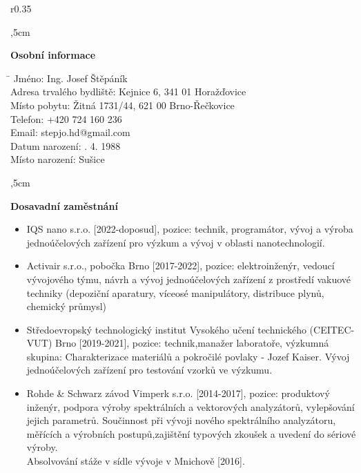 \documentclass[12pt]{article}
\begin{document}
\noindent\hrulefill

\begin{wrapfigure}{r}{0.35\textwidth}
\vspace{-1cm}
\end{wrapfigure}

,5cm

\textbf{Osobní informace} 
\begin{tabbing}
    \hspace{6cm}\= \kill
    Jméno: \> Ing. Josef Štěpáník \\
    Adresa trvalého bydliště: \> Kejnice 6, 341 01 Horažďovice \\
    Místo pobytu: \> Žitná 1731/44, 621 00 Brno-Řečkovice \\
    Telefon: \> +420 724 160 236 \\
    Email: \> stepjo.hd@gmail.com \\
    Datum narození: . 4. 1988 \\
    Místo narození: \> Sušice \\
\end{tabbing}

\noindent\hrulefill
{},5cm

\textbf{Dosavadní zaměstnání}

\begin{itemize}
\item IQS nano s.r.o. [2022-doposud], pozice: technik, programátor, vývoj a výroba jednoúčelových zařízení pro výzkum a vývoj v oblasti nanotechnologií.


\item Activair s.r.o., pobočka Brno [2017-2022], pozice: elektroinženýr, vedoucí vývojového týmu, návrh a vývoj jednoúčelových zařízení z prostředí vakuové techniky (depoziční aparatury, víceosé manipulátory, distribuce plynů, chemický průmysl) 

\item 
Středoevropský technologický institut Vysokého učení technického 
(CEITEC-VUT) Brno [2019-2021], pozice: technik,manažer laboratoře,  výzkumná skupina: Charakterizace materiálů a pokročilé povlaky - Jozef Kaiser. 
Vývoj jednoúčelových zařízení pro testování vzorků ve výzkumu. 

\item Rohde \& Schwarz závod Vimperk s.r.o. [2014-2017], pozice: produktový inženýr, podpora výroby spektrálních a vektorových analyzátorů, vylepšování jejich parametrů. Součinnost při vývoji nového spektrálního analyzátoru, měřících a výrobních postupů,zajištění typových zkoušek a uvedení do sériové výroby. \\
Absolvování stáže v sídle vývoje v Mnichově [2016].
 
\end{itemize}
\end{document}
